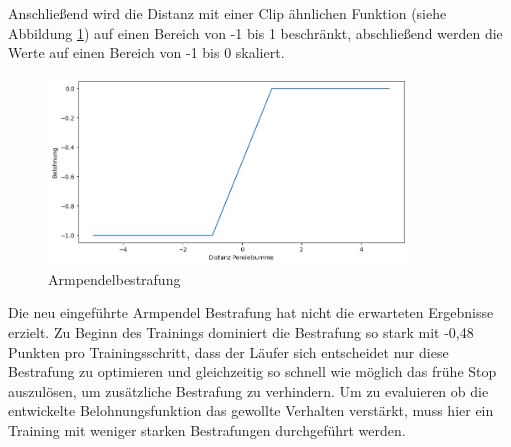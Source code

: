 Anschließend wird die Distanz mit einer Clip ähnlichen Funktion (siehe Abbildung \ref{fig:plot_hand_pendel}) auf einen Bereich von -1 bis 1 beschränkt, abschließend werden die Werte auf einen Bereich von -1 bis 0 skaliert.

\begin{figure}[H]
  \centering  
  \includegraphics[width=0.85\textwidth]{img/plot_hand_pendel}
  \caption{Armpendelbestrafung}
  \label{fig:plot_hand_pendel}
\end{figure}

Die neu eingeführte Armpendel Bestrafung hat nicht die erwarteten Ergebnisse erzielt. Zu Beginn des Trainings dominiert die Bestrafung so stark mit -0,48 Punkten pro Trainingsschritt, dass der Läufer sich entscheidet nur diese Bestrafung zu optimieren und gleichzeitig so schnell wie möglich das frühe Stop auszulösen, um zusätzliche Bestrafung zu verhindern. Um zu evaluieren ob die entwickelte Belohnungsfunktion das gewollte Verhalten verstärkt, muss hier ein Training mit weniger starken Bestrafungen durchgeführt werden.

